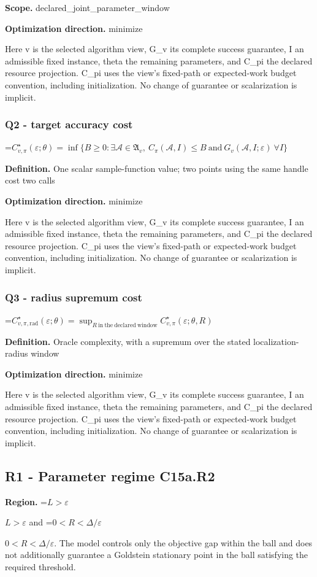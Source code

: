 \documentclass[10pt,a4paper]{article}
\newcommand{\AtlasMath}[1]{\par\begingroup\centering\setbox0=\hbox{$\displaystyle #1$}\ifdim\wd0>1.4\linewidth\typeout{ATLAS WIDE FORMULA: \the\wd0}\fi\ifdim\wd0>\linewidth\resizebox{\linewidth}{!}{\box0}\else\box0\fi\par\endgroup}
\newcommand{\AtlasInlineMath}[1]{\begingroup\setbox0=\hbox{$#1$}\ifdim\wd0>.4\linewidth\endgroup\AtlasMath{#1}\else\endgroup$#1$\fi}
\begin{document}
\textbf{Scope.} declared\_joint\_parameter\_window

\textbf{Optimization direction.} minimize

Here v is the selected algorithm view, G\_v its complete success guarantee, I an admissible fixed instance, theta the remaining parameters, and C\_pi the declared resource projection. C\_pi uses the view's fixed-path or expected-work budget convention, including initialization. No change of guarantee or scalarization is implicit.

\subsubsection{Q2 - target accuracy cost}
\AtlasMath{C^\star_{v,\pi}(\varepsilon;\theta)=\inf\{B\ge0:\exists\mathcal A\in\mathfrak A_v,\ C_\pi(\mathcal A,I)\le B\ \text{and}\ G_v(\mathcal A,I;\varepsilon)\ \forall I\}}
\textbf{Definition.} One scalar sample-function value; two points using the same handle cost two calls

\textbf{Optimization direction.} minimize

Here v is the selected algorithm view, G\_v its complete success guarantee, I an admissible fixed instance, theta the remaining parameters, and C\_pi the declared resource projection. C\_pi uses the view's fixed-path or expected-work budget convention, including initialization. No change of guarantee or scalarization is implicit.

\subsubsection{Q3 - radius supremum cost}
\AtlasMath{C^\star_{v,\pi,\mathrm{rad}}(\varepsilon;\theta)=\sup_{R\ \mathrm{in\ the\ declared\ window}}C^\star_{v,\pi}(\varepsilon;\theta,R)}
\textbf{Definition.} Oracle complexity, with a supremum over the stated localization-radius window

\textbf{Optimization direction.} minimize

Here v is the selected algorithm view, G\_v its complete success guarantee, I an admissible fixed instance, theta the remaining parameters, and C\_pi the declared resource projection. C\_pi uses the view's fixed-path or expected-work budget convention, including initialization. No change of guarantee or scalarization is implicit.

\subsection{R1 - Parameter regime C15a.R2}
\textbf{Region.} \AtlasInlineMath{L>\varepsilon} and \AtlasInlineMath{0<R<\Delta/\varepsilon}. The model controls only the objective gap within the ball and does not additionally guarantee a Goldstein stationary point in the ball satisfying the required threshold.
\end{document}
